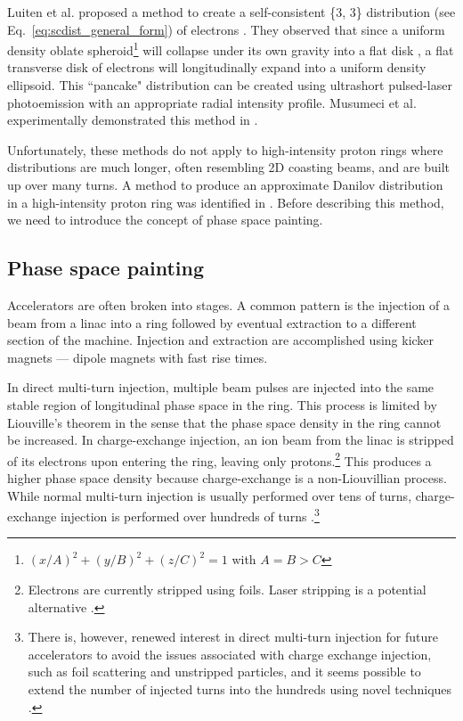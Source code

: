 Luiten et al. proposed a method to create a self-consistent \{3, 3\} distribution (see Eq.~\eqref{eq:scdist_general_form}) of electrons \cite{Luiten2004}. They observed that since a uniform density oblate spheroid\footnote{$(x/A)^2 + (y/B)^2 + (z/C)^2 = 1$ with $A = B > C$} will collapse under its own gravity into a flat disk \cite{Lin1965}, a flat transverse disk of electrons will longitudinally expand into a uniform density ellipsoid. This ``pancake" distribution can be created using ultrashort pulsed-laser photoemission with an appropriate radial intensity profile. Musumeci et al. experimentally demonstrated this method in \cite{Musumeci2008}. 

Unfortunately, these methods do not apply to high-intensity proton rings where distributions are much longer, often resembling 2D coasting beams, and are built up over many turns. A method to produce an approximate Danilov distribution in a high-intensity proton ring was identified in \cite{Danilov2003}. Before describing this method, we need to introduce the concept of phase space painting. 


\subsection{Phase space painting}

Accelerators are often broken into stages. A common pattern is the injection of a beam from a linac into a ring followed by eventual extraction to a different section of the machine. Injection and extraction are accomplished using kicker magnets — dipole magnets with fast rise times.

In direct multi-turn injection, multiple beam pulses are injected into the same stable region of longitudinal phase space in the ring. This process is limited by Liouville's theorem in the sense that the phase space density in the ring cannot be increased. In charge-exchange injection, an ion beam from the linac is stripped of its electrons upon entering the ring, leaving only protons.\footnote{Electrons are currently stripped using foils. Laser stripping is a potential alternative \cite{Cousineau2017}.} This produces a higher phase space density because charge-exchange is a non-Liouvillian process. While normal multi-turn injection is usually performed over tens of turns, charge-exchange injection is performed over hundreds of turns \cite{Bracco2017}.\footnote{There is, however, renewed interest in direct multi-turn injection for future accelerators to avoid the issues associated with charge exchange injection, such as foil scattering and unstripped particles, and it seems possible to extend the number of injected turns into the hundreds using novel techniques \cite{Prior2016}.} 

